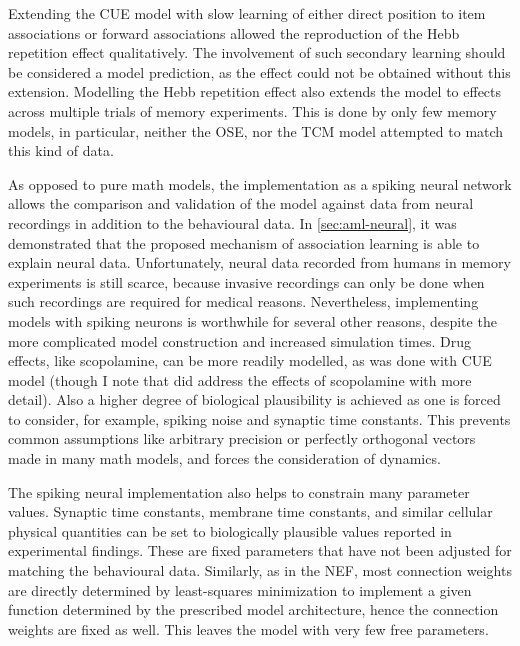 Extending the CUE model with slow learning of either direct position to item associations or forward associations allowed the reproduction of the Hebb repetition effect qualitatively.
The involvement of such secondary learning should be considered a model prediction, as the effect could not be obtained without this extension.
Modelling the Hebb repetition effect also extends the model to effects across multiple trials of memory experiments.
This is done by only few memory models, in particular, neither the OSE, nor the TCM model attempted to match this kind of data.

As opposed to pure math models, the implementation as a spiking neural network allows the comparison and validation of the model against data from neural recordings in addition to the behavioural data.
In \cref{sec:aml-neural}, it was demonstrated that the proposed mechanism of association learning is able to explain neural data.
Unfortunately, neural data recorded from humans in memory experiments is still scarce, because invasive recordings can only be done when such recordings are required for medical reasons.
Nevertheless, implementing models with spiking neurons is worthwhile for several other reasons, despite the more complicated model construction and increased simulation times.
Drug effects, like scopolamine, can be more readily modelled, as was done with CUE model (though I note that \textcite{hasselmo1997} did address the effects of scopolamine with more detail).
Also a higher degree of biological plausibility is achieved as one is forced to consider, for example, spiking noise and synaptic time constants.
This prevents common assumptions like arbitrary precision or perfectly orthogonal vectors made in many math models, and forces the consideration of dynamics.

The spiking neural implementation also helps to constrain many parameter values.
Synaptic time constants, membrane time constants, and similar cellular physical quantities can be set to biologically plausible values reported in experimental findings.
These are fixed parameters that have not been adjusted for matching the behavioural data.
Similarly, as in the NEF, most connection weights are directly determined by least-squares minimization to implement a given function determined by the prescribed model architecture, hence the connection weights are fixed as well.
This leaves the model with very few free parameters.


